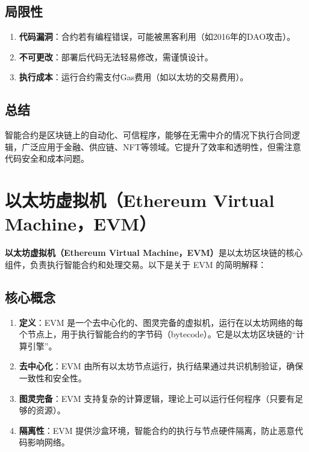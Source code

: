 \documentclass[12pt]{ctexart}
\begin{document}
\subsection{局限性}
\begin{enumerate}
    \item \textbf{代码漏洞}：合约若有编程错误，可能被黑客利用（如2016年的DAO攻击）。
    \item \textbf{不可更改}：部署后代码无法轻易修改，需谨慎设计。
    \item \textbf{执行成本}：运行合约需支付Gas费用（如以太坊的交易费用）。
\end{enumerate}

\subsection{总结}
智能合约是区块链上的自动化、可信程序，能够在无需中介的情况下执行合同逻辑，广泛应用于金融、供应链、NFT等领域。它提升了效率和透明性，但需注意代码安全和成本问题。

\newpage

\section{以太坊虚拟机（Ethereum Virtual Machine，EVM）}
\textbf{以太坊虚拟机（Ethereum Virtual Machine，EVM）}是以太坊区块链的核心组件，负责执行智能合约和处理交易。以下是关于 EVM 的简明解释：

\subsection{核心概念}
\begin{enumerate}
    \item \textbf{定义}：EVM 是一个去中心化的、图灵完备的虚拟机，运行在以太坊网络的每个节点上，用于执行智能合约的字节码（bytecode）。它是以太坊区块链的“计算引擎”。
    \item \textbf{去中心化}：EVM 由所有以太坊节点运行，执行结果通过共识机制验证，确保一致性和安全性。
    \item \textbf{图灵完备}：EVM 支持复杂的计算逻辑，理论上可以运行任何程序（只要有足够的资源）。
    \item \textbf{隔离性}：EVM 提供沙盒环境，智能合约的执行与节点硬件隔离，防止恶意代码影响网络。
\end{enumerate}
\end{document}

